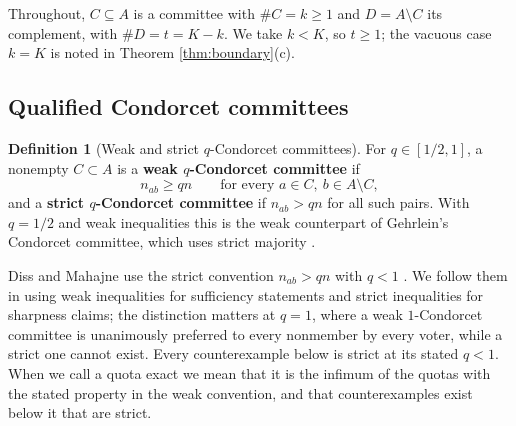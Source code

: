 \documentclass[11pt]{article}
\theoremstyle{plain}
\theoremstyle{definition}
\newtheorem{definition}{Definition}
\begin{document}
Throughout, $C\subseteq A$ is a committee with $\#C=k\ge1$ and $D=A\setminus C$ its complement, with $\#D=t=K-k$. We take $k<K$, so $t\ge1$; the vacuous case $k=K$ is noted in Theorem \ref{thm:boundary}(c).

\subsection{Qualified Condorcet committees}

\begin{definition}[Weak and strict $q$-Condorcet committees]
\label{def:qcond}
For $q\in[1/2,1]$, a nonempty $C\subset A$ is a \textbf{weak $q$-Condorcet committee} if
\[
n_{ab}\ge qn\qquad\text{for every } a\in C,\ b\in A\setminus C,
\]
and a \textbf{strict $q$-Condorcet committee} if $n_{ab}>qn$ for all such pairs. With $q=1/2$ and weak inequalities this is the weak counterpart of Gehrlein's Condorcet committee, which uses strict majority \cite{Gehrlein1985}.
\end{definition}

Diss and Mahajne use the strict convention $n_{ab}>qn$ with $q<1$ \cite[Definition~5]{DissMahajne2020}. We follow them in using weak inequalities for sufficiency statements and strict inequalities for sharpness claims; the distinction matters at $q=1$, where a weak $1$-Condorcet committee is unanimously preferred to every nonmember by every voter, while a strict one cannot exist. Every counterexample below is strict at its stated $q<1$. When we call a quota exact we mean that it is the infimum of the quotas with the stated property in the weak convention, and that counterexamples exist below it that are strict.
\end{document}
